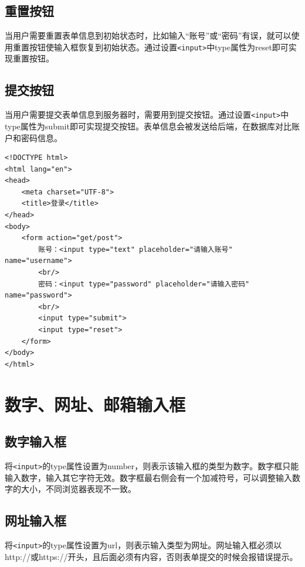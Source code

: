 \subsection{重置按钮}

当用户需要重置表单信息到初始状态时，比如输入“账号”或“密码”有误，就可以使用重置按钮使输入框恢复到初始状态。通过设置\lstinline|<input>|中type属性为reset即可实现重置按钮。

\subsection{提交按钮}

当用户需要提交表单信息到服务器时，需要用到提交按钮。通过设置\lstinline|<input>|中type属性为submit即可实现提交按钮。表单信息会被发送给后端，在数据库对比账户和密码信息。

\begin{lstlisting}[style=htmlcssjs, title=登录功能]
<!DOCTYPE html>
<html lang="en">
<head>
    <meta charset="UTF-8">
    <title>登录</title>
</head>
<body>
    <form action="get/post">
        账号：<input type="text" placeholder="请输入账号" name="username">
        <br/>
        密码：<input type="password" placeholder="请输入密码" name="password">
        <br/>
        <input type="submit">
        <input type="reset">
    </form>
</body>
</html>
\end{lstlisting}

\newpage

\section{数字、网址、邮箱输入框}

\subsection{数字输入框}

将\lstinline|<input>|的type属性设置为number，则表示该输入框的类型为数字。数字框只能输入数字，输入其它字符无效。数字框最右侧会有一个加减符号，可以调整输入数字的大小，不同浏览器表现不一致。

\subsection{网址输入框}

将\lstinline|<input>|的type属性设置为url，则表示输入类型为网址。网址输入框必须以http://或https://开头，且后面必须有内容，否则表单提交的时候会报错误提示。


